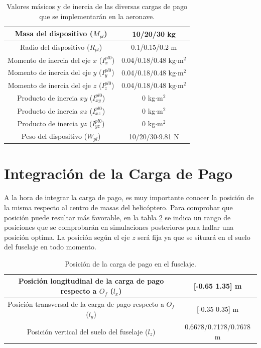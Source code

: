 \begin{table}[htbp]
	\centering
	\begin{tabular}{|>{\columncolor{Gray}}c|c|}
		\hline
		\cellcolor{Gray}Masa del dispositivo ($M_{pl}$) & 10/20/30 kg \\ \hline
		\cellcolor{Gray}Radio del dispositivo ($R_{pl}$) & 0.1/0.15/0.2 m \\ \hline
		\cellcolor{Gray}Momento de inercia del eje $x$ ($I_{x}^{pl0}$) & 0.04/0.18/0.48 kg$\cdot$m$^2$ \\ \hline
		\cellcolor{Gray}Momento de inercia del eje $y$ ($I_{y}^{pl0}$) & 0.04/0.18/0.48 kg$\cdot$m$^2$ \\ \hline
		\cellcolor{Gray}Momento de inercia del eje $z$ ($I_{z}^{pl0}$) & 0.04/0.18/0.48 kg$\cdot$m$^2$ \\ \hline
		\cellcolor{Gray}Producto de inercia $xy$ ($I_{xy}^{pl0}$)& 0 kg$\cdot$m$^2$ \\ \hline
		\cellcolor{Gray}Producto de inercia $xz$ ($I_{xz}^{pl0}$)& 0 kg$\cdot$m$^2$ \\ \hline
		\cellcolor{Gray}Producto de inercia $yz$ ($I_{yz}^{pl0}$)& 0 kg$\cdot$m$^2$ \\ \hline
		\cellcolor{Gray}Peso del dispositivo ($W_{pl}$)& 10/20/30$\cdot$9.81 N \\ \hline
	\end{tabular}%
	\caption{Valores másicos y de inercia de las diversas cargas de pago que se implementarán en la aeronave.}
	\label{tablaPL}
\end{table}%

\section{Integración de la Carga de Pago}

A la hora de integrar la carga de pago, es muy importante conocer la posición de la misma respecto al centro de masas del helicóptero. Para comprobar que posición puede resultar más favorable, en la tabla \ref{CGPL} se indica un rango de posiciones que se comprobarán en simulaciones posteriores para hallar una posición optima. La posición según el eje $z$ será fija ya que se situará en el suelo del fuselaje en todo momento.

\begin{table}[htbp]
	\centering
	\begin{tabular}{|>{\columncolor{Gray}}c|c|}
		\hline
		\cellcolor{Gray}Posición longitudinal de la carga de pago respecto a $O_f$ ($l_x$) & [-0.65 1.35] m \\ \hline
		\cellcolor{Gray}Posición transversal de la carga de pago respecto a $O_f$ ($l_y$) & [-0.35 0.35] m \\ \hline
		\cellcolor{Gray}Posición vertical del suelo del fuselaje ($l_z$) & 0.6678/0.7178/0.7678 m \\ \hline
	\end{tabular}%
	\caption{Posición de la carga de pago en el fuselaje.}
	\label{CGPL}
\end{table}%

